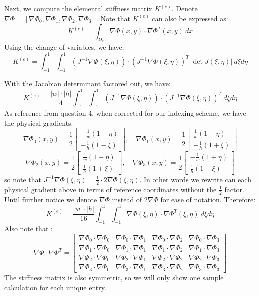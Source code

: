 \documentclass[12pt]{article}
\newcounter{question}
\begin{document}
Next, we compute the elemental stiffness matrix $K^{(e)}$. Denote $\nabla \Phi = [\nabla \Phi_0, \nabla \Phi_1, \nabla \Phi_2, \nabla \Phi_3]$. Note that $K^{(e)}$ can also be expressed as:
\[K^{(e)} = \int_{\Omega_e} \nabla \Phi(x,y) \cdot \nabla \Phi^T(x,y) \ dx\]
Using the change of variables, we have:
\[K^{(e)} = \int_{-1}^{1} \int_{-1}^{1} (J^{-1}\nabla \Phi(\xi,\eta)) \cdot (J^{-1} \nabla \Phi(\xi,\eta))^T |\det{J(\xi,\eta)}| \ d\xi d\eta\]

With the Jacobian determinant factored out, we have:
\[K^{(e)} = \frac{ |w| \cdot |h|}{4} \int_{-1}^{1} \int_{-1}^{1} (J^{-1}\nabla \Phi(\xi,\eta)) \cdot (J^{-1} \nabla \Phi(\xi,\eta))^T \ d\xi d\eta\]
As reference from question 4, when corrected for our indexing scheme, we have the physical gradients:
\[\nabla  \Phi_0(x,y) = \frac{1}{2}\begin{bmatrix}
-\frac{1}{w}(1-\eta) \\ -\frac{1}{h}(1-\xi)
\end{bmatrix}, \quad \nabla  \Phi_1(x,y) = \frac{1}{2}\begin{bmatrix}
\frac{1}{w}(1-\eta) \\ -\frac{1}{h}(1+\xi)
\end{bmatrix}\] 
\[\nabla  \Phi_2(x,y) = \frac{1}{2}\begin{bmatrix}
\frac{1}{w}(1+\eta) \\ \frac{1}{h}(1+\xi)
\end{bmatrix}, \quad \nabla  \Phi_3(x,y) = \frac{1}{2}\begin{bmatrix}
-\frac{1}{w}(1+\eta) \\ \frac{1}{h}(1-\xi)
\end{bmatrix}\]
so note that $J^{-1}\nabla \Phi(\xi,\eta) = \frac{1}{2} \cdot 2 \nabla \Phi(\xi,\eta)$. In other words we rewrite can each physical gradient above in terms of reference coordinates without the $\frac{1}{2}$ factor. Until further notice we denote $\nabla \Phi$ instead of $2\nabla \Phi$ for ease of notation.
Therefore:
\[K^{(e)} = \frac{ |w| \cdot |h|}{16} \int_{-1}^{1} \int_{-1}^{1} \nabla \Phi(\xi,\eta) \cdot \nabla \Phi^T(\xi,\eta) \ d\xi d\eta\]
Also note that :
\[\nabla \Phi \cdot \nabla \Phi^T = \begin{bmatrix}
\nabla \Phi_0 \cdot \nabla \Phi_0  & \nabla \Phi_0  \cdot \nabla \Phi_1  & \nabla \Phi_0  \cdot \nabla \Phi_2  & \nabla \Phi_0  \cdot \nabla \Phi_3  \\
\nabla \Phi_1  \cdot \nabla \Phi_0  & \nabla \Phi_1  \cdot \nabla \Phi_1  & \nabla \Phi_1  \cdot \nabla \Phi_2  & \nabla \Phi_1  \cdot \nabla \Phi_3  \\
\nabla \Phi_2  \cdot \nabla \Phi_0  & \nabla \Phi_2  \cdot \nabla \Phi_1  & \nabla \Phi_2  \cdot \nabla \Phi_2  & \nabla \Phi_2  \cdot \nabla \Phi_3  \\
\nabla \Phi_3  \cdot \nabla \Phi_0  & \nabla \Phi_3  \cdot \nabla \Phi_1  & \nabla \Phi_3  \cdot \nabla \Phi_2  & \nabla \Phi_3  \cdot \nabla \Phi_3
\end{bmatrix}\]
The stiffness matrix is also symmetric, so we will only show one sample calculation for each unique entry.
\end{document}
